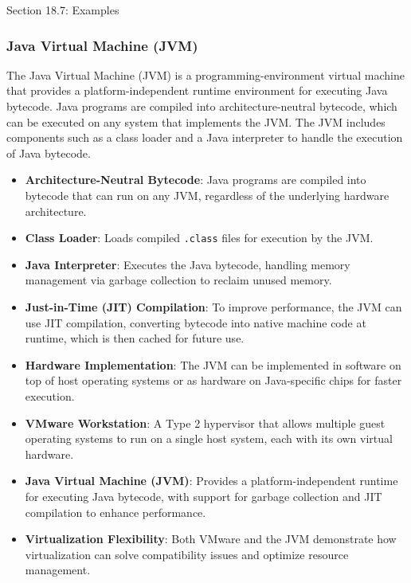 \begin{notes}{Section 18.7: Examples}
\begin{highlight}
    \end{highlight}
    
    \subsubsection*{Java Virtual Machine (JVM)}
    
    The Java Virtual Machine (JVM) is a programming-environment virtual machine that provides a platform-independent runtime environment for executing Java bytecode. Java programs are compiled into 
    architecture-neutral bytecode, which can be executed on any system that implements the JVM. The JVM includes components such as a class loader and a Java interpreter to handle the execution of Java bytecode.
    
    \begin{highlight}
    
        \begin{itemize}
            \item \textbf{Architecture-Neutral Bytecode}: Java programs are compiled into bytecode that can run on any JVM, regardless of the underlying hardware architecture.
            \item \textbf{Class Loader}: Loads compiled \texttt{.class} files for execution by the JVM.
            \item \textbf{Java Interpreter}: Executes the Java bytecode, handling memory management via garbage collection to reclaim unused memory.
            \item \textbf{Just-in-Time (JIT) Compilation}: To improve performance, the JVM can use JIT compilation, converting bytecode into native machine code at runtime, which is then cached for future use.
            \item \textbf{Hardware Implementation}: The JVM can be implemented in software on top of host operating systems or as hardware on Java-specific chips for faster execution.
        \end{itemize}
    
    \end{highlight}
    
    \begin{highlight}
    
        \begin{itemize}
            \item \textbf{VMware Workstation}: A Type 2 hypervisor that allows multiple guest operating systems to run on a single host system, each with its own virtual hardware.
            \item \textbf{Java Virtual Machine (JVM)}: Provides a platform-independent runtime for executing Java bytecode, with support for garbage collection and JIT compilation to enhance performance.
            \item \textbf{Virtualization Flexibility}: Both VMware and the JVM demonstrate how virtualization can solve compatibility issues and optimize resource management.
        \end{itemize}
    

\end{highlight}
\end{notes}
